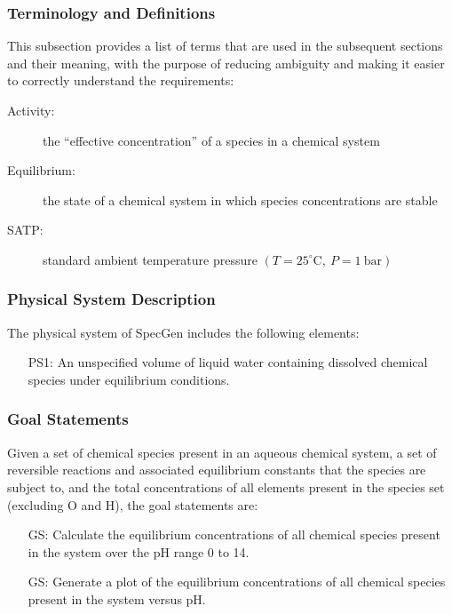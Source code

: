 \documentclass[12pt]{article}
\newcounter{goalnum} %
\newcommand{\progname}{SpecGen} %
\begin{document}
\subsubsection{Terminology and Definitions}

This subsection provides a list of terms that are used in the subsequent
sections and their meaning, with the purpose of reducing ambiguity and making it
easier to correctly understand the requirements:

\begin{description}
\item[Activity:] the ``effective concentration'' of a species in a chemical 
  system
\item[Equilibrium:] the state of a chemical system in which species 
  concentrations are stable
\item[SATP:] standard ambient temperature pressure
  $(T = 25^{\circ}\textrm{C}, ~P = 1~\textrm{bar})$  
\end{description}

\subsubsection{Physical System Description}

The physical system of \progname{} includes the following elements:

\begin{itemize}
\item[PS1:] An unspecified volume of liquid water containing dissolved chemical 
  species under equilibrium conditions.
\end{itemize}


\subsubsection{Goal Statements}

\noindent Given a set of chemical species present in an aqueous chemical system, 
a set of reversible reactions and associated equilibrium constants that the 
species are subject to, and the total concentrations of all elements present in 
the species set (excluding O and H), the goal statements are:

\begin{itemize}

\item[GS\refstepcounter{goalnum}\thegoalnum \label{G_solve}:] Calculate the 
  equilibrium concentrations of all chemical species present in the system over 
  the pH range 0 to 14.
\item[GS\refstepcounter{goalnum}\thegoalnum \label{G_plot}:] Generate a plot of 
  the equilibrium concentrations of all chemical species present in the system 
  versus pH.
\end{itemize}
\end{document}
